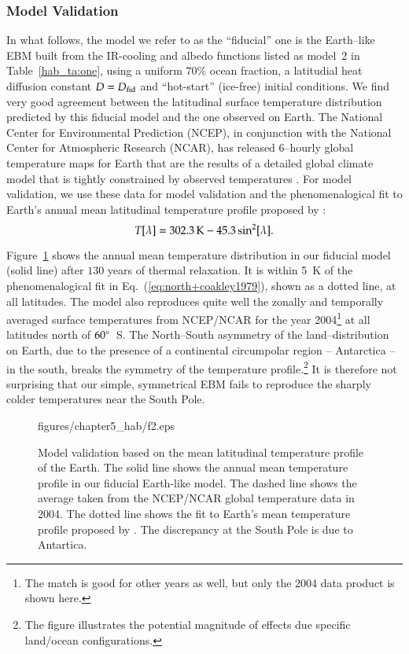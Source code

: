 \subsubsection{Model Validation}
\label{hab_sssec:valid}

In what follows, {the model we refer to as the ``fiducial'' one is the
Earth--like EBM} built from the IR-cooling and albedo functions listed
as model~2 in Table~\ref{hab_ta:one}, using a uniform $70$\% ocean
fraction, a latitudial heat diffusion constant $D=D_{\rm fid}$ and
``hot-start'' (ice-free) initial conditions.  We find very good
agreement between the latitudinal surface temperature distribution
predicted by this fiducial model and the one observed on Earth.  The
National Center for Environmental Prediction (NCEP), in conjunction
with the National Center for Atmospheric Research (NCAR), has released
6--hourly global temperature maps for Earth that are the results of a
detailed global climate model that is tightly constrained by observed
temperatures \citep{kistler_et_al1999, kalnay_et_al1996}.  For model
validation, we use these data for model validation and the
phenomenalogical fit to Earth's annual mean latitudinal temperature
profile proposed by \citet{north+coakley1979}:
\begin{equation}
\label{eq:north+coakley1979}
T[\lambda] = 302.3\,{\rm K}- 45.3 \sin^2[\lambda].
\end{equation}

Figure~\ref{hab_fig:us+NC1979} shows the annual mean temperature
distribution in our fiducial model (solid line) after $130$ years of
thermal relaxation. It is within 5~K of the phenomenalogical fit in
Eq.~(\ref{eq:north+coakley1979}), shown as a dotted line, at all
latitudes.  The model also reproduces quite well the zonally and
temporally averaged surface temperatures from NCEP/NCAR for the year
2004\footnote{The match is good for other years as well, but only the
2004 data product is shown here.} at all latitudes north of
$60\mbox{$^\circ$}$~S. The North--South asymmetry of the land--distribution on
Earth, due to the presence of a continental circumpolar region --
Antarctica -- in the south, breaks the symmetry of the temperature
profile.\footnote{The figure illustrates the potential magnitude of
effects due specific land/ocean configurations.}  It is therefore not
surprising that our simple, symmetrical EBM fails to reproduce the
sharply colder temperatures near the South Pole.
\begin{figure}[p]
\plotone
{figures/chapter5_hab/f2.eps}
\caption[Model validation based on the mean latitudinal temperature
profile of the Earth.]{Model validation based on the mean latitudinal
temperature profile of the Earth.  The solid line shows the annual
mean temperature profile in our fiducial Earth-like model. The dashed
line shows the average taken from the NCEP/NCAR global temperature
data in 2004. The dotted line shows the fit to Earth's mean
temperature profile proposed by \citet{north+coakley1979}. The
discrepancy at the South Pole is due to Antartica.}
\label{hab_fig:us+NC1979}
\end{figure}
\afterpage{\clearpage}

